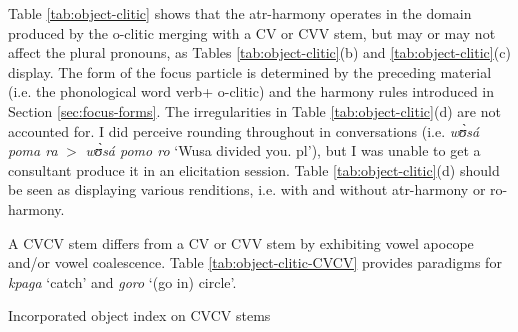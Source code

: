 \begin{exe}
\begin{exe}
\begin{exe}
{\begin{exe}
\begin{exe}
\begin{exe}
\begin{exe}
\begin{exe}
\begin{exe}
\begin{exe}
\begin{xlist}
\begin{exe}
\begin{exe}
\begin{exe}
\begin{exe}
\begin{exe}
\begin{exe}
\begin{exe}
\begin{exe}
\begin{exe}
\begin{exe}
\begin{exe}
\begin{exe}
\begin{exe}
\begin{exe}
\begin{exe}
Table \ref{tab:object-clitic} shows that the {\sc atr}-harmony 
operates in the domain produced by the {\sc
o}-clitic merging with a CV or CVV stem, but may or may not affect the
plural pronouns, as Tables \ref{tab:object-clitic}(b) and 
\ref{tab:object-clitic}(c) display. The form of the focus particle is determined
by
the preceding material (i.e. the phonological word  verb+{\sc
o}-clitic) and the harmony rules introduced in
Section
\ref{sec:focus-forms}.  The irregularities in Table \ref{tab:object-clitic}(d)
are not accounted for.  I did perceive rounding throughout in conversations
(i.e.  {\it wʊ̀sá poma ra} $>$ {\it wʊ̀sá pomo ro} `Wusa divided you.{\sc 
pl}'), 
but
I was unable to get a consultant  produce it in an elicitation session. Table
\ref{tab:object-clitic}(d) should be seen as displaying various renditions,
i.e. with and without {\sc atr-}harmony or {\sc ro-}harmony.


A CVCV stem differs from a CV or CVV stem by exhibiting vowel apocope and/or 
vowel
coalescence.  Table \ref{tab:object-clitic-CVCV} provides paradigms for {\it 
kpaga} `catch' and {\it goro} `(go in) circle'. 



\begin{table}[!htb]
\centering
\caption{Incorporated object index on  CVCV stems
\label{tab:object-clitic-CVCV}}


\end{table}
\end{exe}
\end{exe}
\end{exe}
\end{exe}
\end{exe}
\end{exe}
\end{exe}
\end{exe}
\end{exe}
\end{exe}
\end{exe}
\end{exe}
\end{exe}
\end{exe}
\end{exe}
\end{xlist}
\end{exe}
\end{exe}
\end{exe}
\end{exe}
\end{exe}
\end{exe}
\end{exe}}
\end{exe}
\end{exe}
\end{exe}
